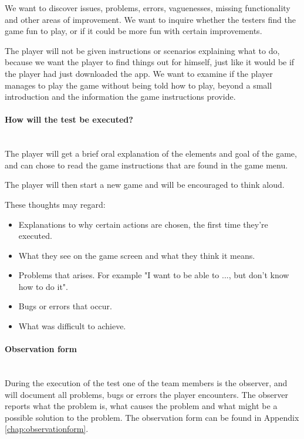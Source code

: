 		We want to discover issues, problems, errors, vaguenesses, missing functionality and other areas 
		of improvement. We want to inquire whether the testers find the game fun to play, or if it could 
		be more fun with certain improvements.

		The player will not be given instructions or scenarios explaining what to do, because we want 
		the player to find things out for himself, just like it would be if the player had just 
		downloaded the app. We want to examine if the player manages to play the game without being 
		told how to play, beyond a small introduction and the information the game instructions provide. 

	\paragraph{How will the test be executed?}\mbox{}\\

		The player will get a brief oral explanation of the elements and goal of the game, 
		and can chose to read the game instructions that are found in the game menu.

		The player will then start a new game and will be encouraged to think aloud. 

		These thoughts may regard:

		\begin{itemize}
		  \item Explanations to why certain actions are chosen, the first time they're executed.
		  \item What they see on the game screen and what they think it means.
		  \item Problems that arises. For example "I want to be able to ..., but don't know how to do it". 
		  \item Bugs or errors that occur.
		  \item What was difficult to achieve.
		\end{itemize}

	\paragraph{Observation form}\mbox{}\\

		During the execution of the test one of the team members is the observer, and will document all problems, bugs or errors the player encounters. The observer reports what the problem is, what causes the problem and what might be a possible solution to the problem. The observation form can be found in Appendix \ref{chap:observationform}.

